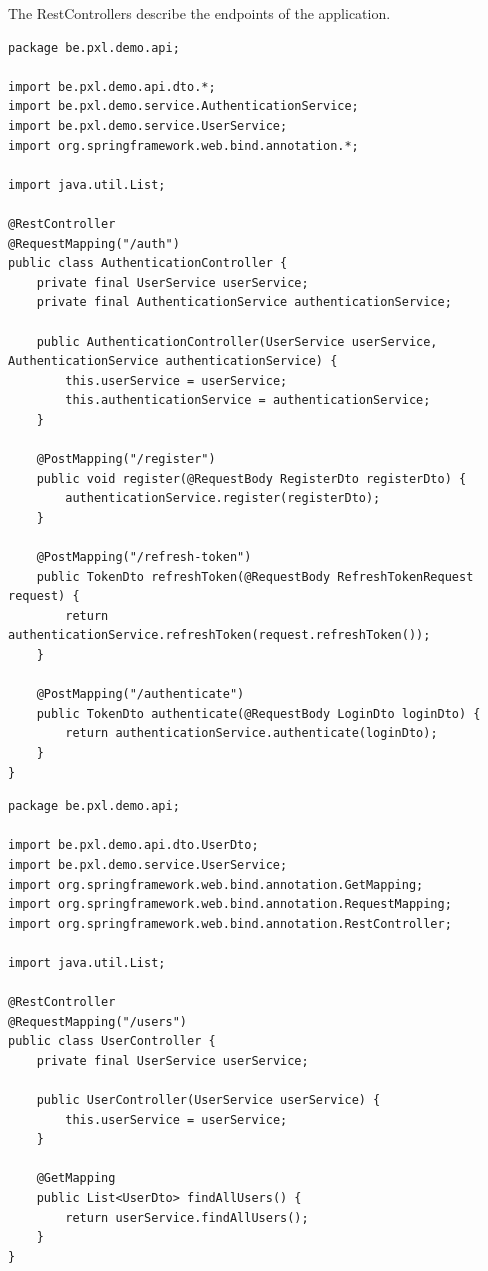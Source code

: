 The RestControllers describe the endpoints of the application. 

\begin{lstlisting}
package be.pxl.demo.api;

import be.pxl.demo.api.dto.*;
import be.pxl.demo.service.AuthenticationService;
import be.pxl.demo.service.UserService;
import org.springframework.web.bind.annotation.*;

import java.util.List;

@RestController
@RequestMapping("/auth")
public class AuthenticationController {
    private final UserService userService;
    private final AuthenticationService authenticationService;

    public AuthenticationController(UserService userService, AuthenticationService authenticationService) {
        this.userService = userService;
        this.authenticationService = authenticationService;
    }

    @PostMapping("/register")
    public void register(@RequestBody RegisterDto registerDto) {
        authenticationService.register(registerDto);
    }

    @PostMapping("/refresh-token")
    public TokenDto refreshToken(@RequestBody RefreshTokenRequest request) {
        return authenticationService.refreshToken(request.refreshToken());
    }

    @PostMapping("/authenticate")
    public TokenDto authenticate(@RequestBody LoginDto loginDto) {
        return authenticationService.authenticate(loginDto);
    }
}
\end{lstlisting}

\begin{lstlisting}
package be.pxl.demo.api;

import be.pxl.demo.api.dto.UserDto;
import be.pxl.demo.service.UserService;
import org.springframework.web.bind.annotation.GetMapping;
import org.springframework.web.bind.annotation.RequestMapping;
import org.springframework.web.bind.annotation.RestController;

import java.util.List;

@RestController
@RequestMapping("/users")
public class UserController {
    private final UserService userService;

    public UserController(UserService userService) {
        this.userService = userService;
    }

    @GetMapping
    public List<UserDto> findAllUsers() {
        return userService.findAllUsers();
    }
}
\end{lstlisting}

